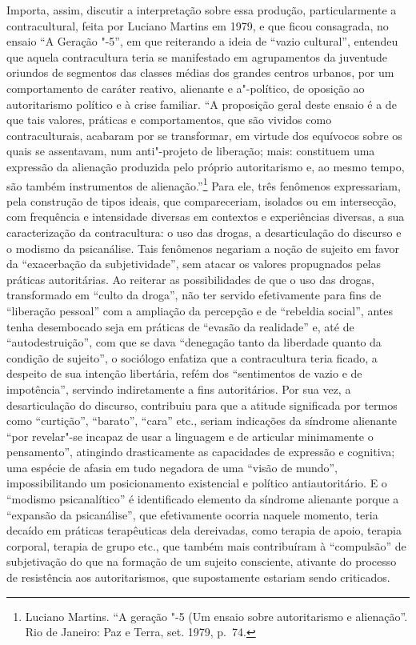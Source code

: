 Importa, assim, discutir a interpretação sobre essa produção,
particularmente a contracultural, feita por Luciano Martins em 1979, e
que ficou consagrada, no ensaio ``A Geração "-5'', em que reiterando a
ideia de ``vazio cultural'', entendeu que aquela contracultura teria se
manifestado em agrupamentos da juventude oriundos de segmentos das
classes médias dos grandes centros urbanos, por um comportamento de
caráter reativo, alienante e a"-político, de oposição ao autoritarismo
político e à crise familiar. ``A proposição geral deste ensaio é a de que
tais valores, práticas e comportamentos, que são vividos como
contraculturais, acabaram por se transformar, em virtude dos equívocos
sobre os quais se assentavam, num anti"-projeto de liberação; mais:
constituem uma expressão da alienação produzida pelo próprio
autoritarismo e, ao mesmo tempo, são também instrumentos de
alienação.''\footnote{Luciano Martins. ``A geração \scalebox{0.8}{AI}"-5 (Um ensaio
  sobre autoritarismo e alienação''. {}
  Rio de Janeiro: Paz e Terra, set. 1979, p.~74.} Para ele, três fenômenos
expressariam, pela construção de tipos ideais, que compareceriam,
isolados ou em intersecção, com frequência e intensidade diversas em
contextos e experiências diversas, a sua caracterização da
contracultura: o uso das drogas, a desarticulação do discurso e o
modismo da psicanálise. Tais fenômenos
negariam a noção de sujeito em favor da ``exacerbação da
subjetividade'', sem atacar os valores propugnados pelas práticas
autoritárias. Ao reiterar as possibilidades de que o uso das drogas,
transformado em ``culto da droga'', não ter servido efetivamente para
fins de ``liberação pessoal'' com a ampliação da percepção e de
``rebeldia social'', antes tenha desembocado seja em práticas de
``evasão da realidade'' e, até de ``autodestruição'', com que se dava
``denegação tanto da liberdade quanto da condição de sujeito'', o
sociólogo enfatiza que a contracultura teria ficado, a despeito de sua
intenção libertária, refém dos ``sentimentos de vazio e de impotência'',
servindo indiretamente a fins autoritários. Por sua vez, a
desarticulação do discurso, contribuiu para que a atitude significada
por termos como ``curtição'', ``barato'', ``cara'' etc., seriam
indicações da síndrome alienante ``por revelar"-se incapaz de usar a
linguagem e de articular minimamente o pensamento'', atingindo
drasticamente as capacidades de expressão e cognitiva; uma espécie de
afasia em tudo negadora de uma ``visão de mundo'', impossibilitando um
posicionamento existencial e político antiautoritário. E o ``modismo
psicanalítico'' é identificado elemento da síndrome alienante porque a
``expansão da psicanálise'', que efetivamente ocorria naquele momento,
teria decaído em práticas terapêuticas dela dereivadas, como terapia de
apoio, terapia corporal, terapia de grupo etc., que também mais
contribuíram à ``compulsão'' de subjetivação do que na formação de um
sujeito consciente, ativante do processo de resistência aos
autoritarismos, que supostamente estariam sendo criticados.

